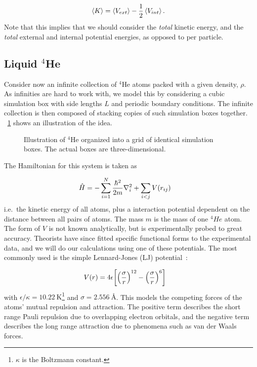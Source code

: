 \documentclass[Thesis.tex]{subfiles}
\begin{document}
\begin{align}
    \expval{K} = \expval{V_{ext}} -
    \frac{1}{2}\expval{V_{int}}.\label{eq:virial-result}
\end{align}
Note that this implies that we should consider the \emph{total} kinetic
energy, and the \emph{total} external and internal potential energies, as opposed to per
particle.


\subsection{Liquid $^4$He}
\label{sec:liquid-helium-theory}

Consider now an infinite collection of $^4$He atoms packed with a given density,
$\rho$. As infinities are hard to work with, we model this by considering a
cubic simulation box with side lengths $L$ and periodic boundary conditions. The
infinite collection is then composed of stacking copies of such simulation boxes
together. ~\cref{fig:pbc-illustration} shows an illustration of the idea.

\begin{figure}[h]
  \centering
  
  \caption{Illustration of $^4$He organized into a grid of identical simulation
    boxes. The actual boxes are three-dimensional.}
  \label{fig:pbc-illustration}
\end{figure}


The Hamiltonian for this system is taken as

\begin{align}
    \hat H &= -\sum_{i=1}^N \frac{\hbar^2}{2m}\laplacian_i + \sum_{i < j} V(r_{ij})
\end{align}
i.e.\ the kinetic energy of all atoms, plus a interaction potential dependent on
the distance between all pairs of atoms. The mass $m$ is the mass of one $^4He$
atom. The form of $V$ is not known analytically, but is experimentally probed to
great accuracy. Theorists have since fitted specific functional forms to the
experimental data, and we will do our calculations using one of these
potentials. The most commonly used is the simple Lennard-Jones (LJ)
potential~\cite{Kalos-1981}:

\begin{align}
    \label{eq:Lennard-Jones-def}
    V(r)
     &= 4\epsilon\qty[\qty( \frac{\sigma}{r} )^{12} - \qty( \frac{\sigma}{r} )^6 ]
\end{align}
with $\epsilon/\kappa = \SI{10.22}{\K}$\footnote{$\kappa$ is the Boltzmann constant.} and $\sigma = \SI{2.556}{\angstrom}$. This
models the competing forces of the atoms' mutual repulsion and attraction. The
positive term describes the short range Pauli repulsion due to overlapping
electron orbitals, and the negative term describes the long range attraction
due to phenomena such as van der Waals forces.
\end{document}
